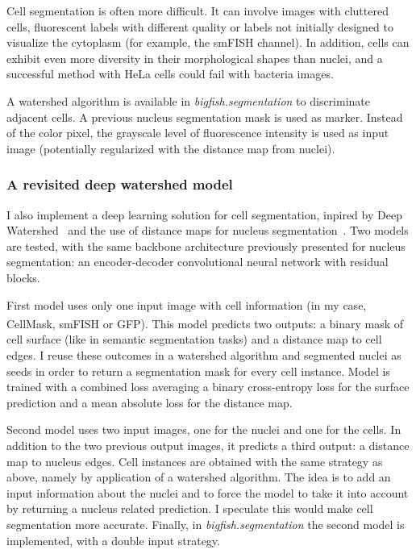 Cell segmentation is often more difficult.
It can involve images with cluttered cells, fluorescent labels with different quality or labels not initially designed to visualize the cytoplasm (for example, the \ac{smFISH} channel).
In addition, cells can exhibit even more diversity in their morphological shapes than nuclei, and a successful method with HeLa cells could fail with bacteria images.

A watershed algorithm is available in \emph{bigfish.segmentation} to discriminate adjacent cells.
A previous nucleus segmentation mask is used as marker.
Instead of the color pixel, the grayscale level of fluorescence intensity is used as input image (potentially regularized with the distance map from nuclei).

\subsubsection{A revisited deep watershed model}

I also implement a deep learning solution for cell segmentation, inpired by Deep Watershed~\cite{Bai_2017_CVPR} and the use of distance maps for nucleus segmentation~\cite{Naylor_2019}.
Two models are tested, with the same backbone architecture previously presented for nucleus segmentation: an encoder-decoder convolutional neural network with residual blocks.

First model uses only one input image with cell information (in my case, CellMask\textsuperscript{\texttrademark}, \ac{smFISH} or \ac{GFP}).
This model predicts two outputs: a binary mask of cell surface (like in semantic segmentation tasks) and a distance map to cell edges.
I reuse these outcomes in a watershed algorithm and segmented nuclei as seeds in order to return a segmentation mask for every cell instance.
Model is trained with a combined loss averaging a binary cross-entropy loss for the surface prediction and a mean absolute loss for the distance map.

Second model uses two input images, one for the nuclei and one for the cells.
In addition to the two previous output images, it predicts a third output: a distance map to nucleus edges.
Cell instances are obtained with the same strategy as above, namely by application of a watershed algorithm.
The idea is to add an input information about the nuclei and to force the model to take it into account by returning a nucleus related prediction.
I speculate this would make cell segmentation more accurate.
Finally, in \emph{bigfish.segmentation} the second model is implemented, with a double input strategy.\\

